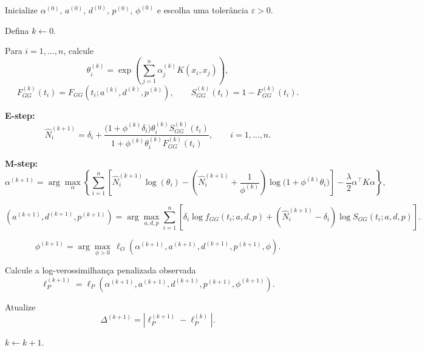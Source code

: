 \begin{algorithm}[H]
\caption{Algoritmo ECME para estimar o modelo GG-KM com riscos latentes Binomial Negativa}
\begin{algorithmic}[1]

\State Inicialize
$
\alpha^{(0)},\,
a^{(0)},\,
d^{(0)},\,
p^{(0)},\,
\phi^{(0)}
$
e escolha uma tolerância $\varepsilon>0$.

\State Defina $k \gets 0$.

\Repeat

\State Para $i=1,\ldots,n$, calcule
\[
\theta_i^{(k)}
=
\exp\!\left(
\sum_{j=1}^{n}
\alpha_j^{(k)}
K(x_i,x_j)
\right),
\]
\[
F_{GG}^{(k)}(t_i)
=
F_{GG}
\!\left(
t_i;
a^{(k)},
d^{(k)},
p^{(k)}
\right),
\qquad
S_{GG}^{(k)}(t_i)
=
1-F_{GG}^{(k)}(t_i).
\]

\State \textbf{E-step:}
\[
\widehat N_i^{(k+1)}
=
\delta_i
+
\frac{
\bigl(1+\phi^{(k)}\delta_i\bigr)
\theta_i^{(k)}
S_{GG}^{(k)}(t_i)
}{
1+\phi^{(k)}
\theta_i^{(k)}
F_{GG}^{(k)}(t_i)
},
\qquad
i=1,\ldots,n.
\]

\State \textbf{M-step:}
\[
\alpha^{(k+1)}
=
\arg\max_{\alpha}
\left\{
\sum_{i=1}^{n}
\left[
\widehat N_i^{(k+1)}
\log(\theta_i)
-
\left(
\widehat N_i^{(k+1)}
+
\frac{1}{\phi^{(k)}}
\right)
\log\!\bigl(1+\phi^{(k)}\theta_i\bigr)
\right]
-
\frac{\lambda}{2}
\alpha^\top K\alpha
\right\},
\]

\[
(a^{(k+1)},d^{(k+1)},p^{(k+1)})
=
\arg\max_{a,d,p}
\sum_{i=1}^{n}
\left[
\delta_i
\log f_{GG}(t_i;a,d,p)
+
(\widehat N_i^{(k+1)}-\delta_i)
\log S_{GG}(t_i;a,d,p)
\right].
\]

\[
\phi^{(k+1)}
=
\arg\max_{\phi>0}
\,
\ell_O
\!\left(
\alpha^{(k+1)},
a^{(k+1)},
d^{(k+1)},
p^{(k+1)},
\phi
\right).
\]

\State Calcule a log-verossimilhança penalizada observada
\[
\ell_P^{(k+1)}
=
\ell_P
\!\left(
\alpha^{(k+1)},
a^{(k+1)},
d^{(k+1)},
p^{(k+1)},
\phi^{(k+1)}
\right).
\]

\State Atualize
\[
\Delta^{(k+1)}
=
\left|
\ell_P^{(k+1)}
-
\ell_P^{(k)}
\right|.
\]

\State $k \gets k+1$.


\end{algorithmic}
\end{algorithm}
